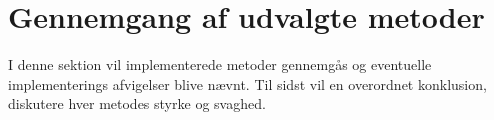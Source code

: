 \chapter{Gennemgang af udvalgte metoder}\label{sec:detmet}
I denne sektion vil implementerede metoder gennemgås og eventuelle implementerings afvigelser blive nævnt. Til sidst vil en overordnet konklusion, diskutere hver metodes styrke og svaghed. 





